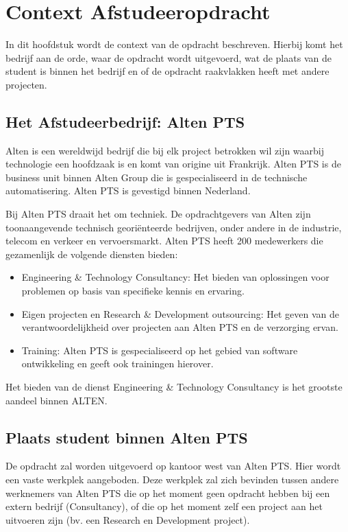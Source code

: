 \documentclass{../local}
\begin{document}
\section{Context Afstudeeropdracht}
In dit hoofdstuk wordt de context van de opdracht beschreven. Hierbij komt het bedrijf aan de orde, waar de opdracht wordt uitgevoerd, wat de plaats van de student is binnen het bedrijf en of de opdracht raakvlakken heeft met andere projecten. 

\subsection{Het Afstudeerbedrijf: Alten PTS}
Alten is een wereldwijd bedrijf die bij elk project betrokken wil zijn waarbij technologie een hoofdzaak is en komt van origine uit Frankrijk. Alten PTS is de business unit binnen Alten Group die is gespecialiseerd in de technische automatisering. Alten PTS is gevestigd binnen Nederland.

Bij Alten PTS draait het om techniek. De opdrachtgevers van Alten zijn toonaangevende technisch georiënteerde bedrijven, onder andere in de industrie, telecom en verkeer en vervoersmarkt. Alten PTS heeft 200 medewerkers die gezamenlijk de volgende diensten bieden:

\begin{itemize}

\item Engineering \& Technology Consultancy: Het bieden van oplossingen voor problemen op basis van specifieke kennis en ervaring.
\item Eigen projecten en Research \& Development outsourcing: Het geven van de verantwoordelijkheid over projecten aan Alten PTS en de verzorging ervan.
\item Training: Alten PTS is gespecialiseerd op het gebied van software ontwikkeling en geeft ook trainingen hierover.

\end{itemize}

Het bieden van de dienst Engineering \& Technology Consultancy is het grootste aandeel binnen ALTEN.

\subsection{Plaats student binnen Alten PTS}
De opdracht zal worden uitgevoerd op kantoor west van Alten PTS. Hier wordt een vaste werkplek aangeboden. Deze werkplek zal zich bevinden tussen andere werknemers van Alten PTS die op het moment geen opdracht hebben bij een extern bedrijf (Consultancy), of die op het moment zelf een project aan het uitvoeren zijn (bv. een Research en Development project).
\end{document}

